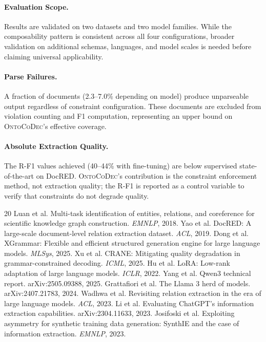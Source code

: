 \documentclass[11pt,a4paper]{article}
\newcommand{\sys}{\textsc{OntoCoDec}}
\begin{document}
\paragraph{Evaluation Scope.}
Results are validated on two datasets and two model families. While the composability pattern is consistent across all four configurations, broader validation on additional schemas, languages, and model scales is needed before claiming universal applicability.

\paragraph{Parse Failures.}
A fraction of documents (2.3--7.0\% depending on model) produce unparseable output regardless of constraint configuration. These documents are excluded from violation counting and F1 computation, representing an upper bound on \sys{}'s effective coverage.

\paragraph{Absolute Extraction Quality.}
The R-F1 values achieved (40--44\% with fine-tuning) are below supervised state-of-the-art on DocRED. \sys{}'s contribution is the constraint enforcement method, not extraction quality; the R-F1 is reported as a control variable to verify that constraints do not degrade quality.

\begin{thebibliography}{20}
 Luan et al. Multi-task identification of entities, relations, and coreference for scientific knowledge graph construction. \emph{EMNLP}, 2018.
 Yao et al. DocRED: A large-scale document-level relation extraction dataset. \emph{ACL}, 2019.
 Dong et al. XGrammar: Flexible and efficient structured generation engine for large language models. \emph{MLSys}, 2025.
 Xu et al. CRANE: Mitigating quality degradation in grammar-constrained decoding. \emph{ICML}, 2025.
 Hu et al. LoRA: Low-rank adaptation of large language models. \emph{ICLR}, 2022.
 Yang et al. Qwen3 technical report. arXiv:2505.09388, 2025.
 Grattafiori et al. The Llama 3 herd of models. arXiv:2407.21783, 2024.
 Wadhwa et al. Revisiting relation extraction in the era of large language models. \emph{ACL}, 2023.
 Li et al. Evaluating ChatGPT's information extraction capabilities. arXiv:2304.11633, 2023.
 Josifoski et al. Exploiting asymmetry for synthetic training data generation: SynthIE and the case of information extraction. \emph{EMNLP}, 2023.
\end{thebibliography}
\end{document}
